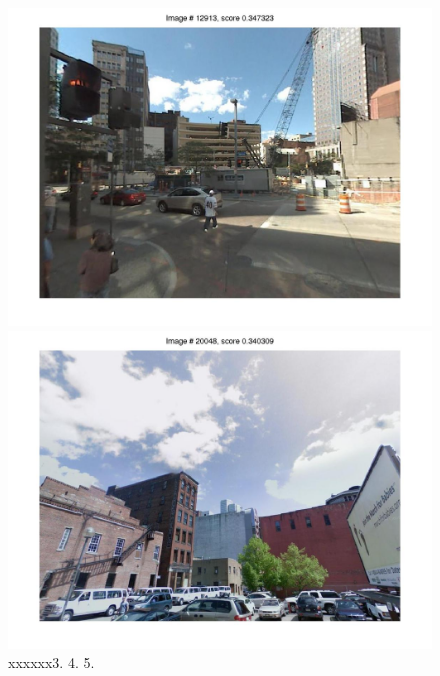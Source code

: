\documentclass[10pt,onecolumn,A4]{article}
\begin{document}
\begin{figure}
\begin{minipage}{0.45\linewidth}
		\colorbox{myCopper4}{\includegraphics[trim = 55mm 40mm 55mm 30mm, clip=true,width=0.30\linewidth]{sup1693/svm04.jpg}}
		\colorbox{myCopper5}{\includegraphics[trim = 55mm 40mm 55mm 30mm, clip=true,width=0.30\linewidth]{sup1693/svm05.jpg}}  \\
		\textcolor{myWhite}{xxxxxx}3. \hspace{0.25\linewidth}4. \hspace{0.25\linewidth}5. \\
	\end{minipage}
\end{figure}
\end{document}
